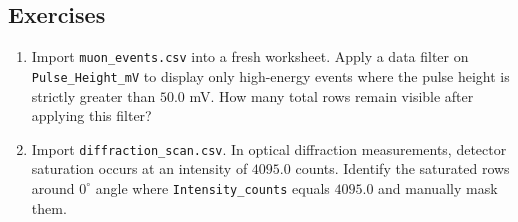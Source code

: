 	\subsection*{Exercises}
		\begin{enumerate}
			\item Import \verb|muon_events.csv| into a fresh worksheet. Apply a data filter on \verb|Pulse_Height_mV| to display only high-energy events where the pulse height is strictly greater than $50.0$ mV. How many total rows remain visible after applying this filter?
			
			\item Import \verb|diffraction_scan.csv|. In optical diffraction measurements, detector saturation occurs at an intensity of $4095.0$ counts. Identify the saturated rows around $0^\circ$ angle where \verb|Intensity_counts| equals $4095.0$ and manually mask them.
		\end{enumerate}